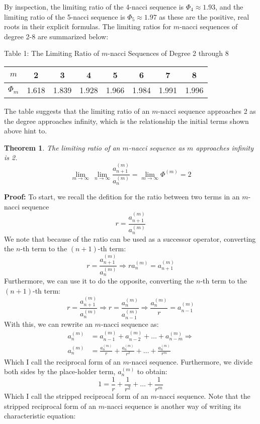 \documentclass[11pt]{article}
\newtheorem{theorem}{Theorem}[section]
\begin{document}
By inspection, the limiting ratio of the 4-nacci sequence is \(\Phi_{4}\approx1.93\), and the limiting ratio of the 5-nacci sequence is \(\Phi_{5}\approx1.97\) as these are the positive, real roots in their explicit formulas. The limiting ratios for \(m\)-nacci sequences of degree 2-8 are summarized below:
\begin{center}
    Table 1: The Limiting Ratio of \(m\)-nacci Sequences of Degree 2 through 8
    \begin{tabular}{|c|c|c|c|c|c|c|c|} 
     \hline
     \(m\) & 2 & 3 & 4 & 5 & 6 & 7 & 8 \\ 
     \hline
     \(\Phi_m\) & 1.618 & 1.839 & 1.928 & 1.966 & 1.984 & 1.991 & 1.996 \\
     \hline
    \end{tabular}
    \end{center}
The table suggests that the limiting ratio of an \(m\)-nacci sequence approaches 2 as the degree approaches infinity, which is the relationship the initial terms shown above hint to. 
\begin{theorem}
    The limiting ratio of an \(m\)-nacci sequence as \(m\) approaches infinity is 2. 
    \[{\lim_{m\to\infty}}\ {\lim_{n\to\infty}} \frac{a^{(m)}_{n+1}}{a^{(m)}_{n}}=\lim_{m\to\infty}\Phi^{(m)}=2\]
\end{theorem}
\textbf{Proof:} To start, we recall the defition for the ratio between two terms in an \(m\)-nacci sequence 
\[r=\frac{a^{(m)}_{n+1}}{a^{(m)}_n}\]
We note that because of the ratio can be used as a successor operator, converting the \(n\)-th term to the \((n+1)\)-th term:
\[r=\frac{a^{(m)}_{n+1}}{a^{(m)}_n}\Rightarrow r a^{(m)}_n = a^{(m)}_{n+1}\]
Furthermore, we can use it to do the opposite, converting the \(n\)-th term to the \((n+1)\)-th term:
\[r=\frac{a^{(m)}_{n+1}}{a^{(m)}_n}\Rightarrow r=\frac{a^{(m)}_{n}}{a^{(m)}_{n-1}}\Rightarrow \frac{a^{(m)}_{n}}{r}=a^{(m)}_{n-1}\]
With this, we can rewrite an \(m\)-nacci sequence as:
\begin{align*}
    a_n^{(m)}&=a_{n-1}^{(m)}+a_{n-2}^{(m)}+\dots +a_{n-m}^{(m)} \Rightarrow\\
    a_n^{(m)}&=\frac{a_n^{(m)}}{r}+\frac{a_n^{(m)}}{r^2}+\dots+\frac{a_n^{(m)}}{r^m}
\end{align*}
Which I call the reciprocal form of an \(m\)-nacci sequence. Furthermore, we divide both sides by the place-holder term, \(a_n^{(m)}\) to obtain:
\[1=\frac{1}{r}+\frac{1}{r^2}+\dots+\frac{1}{r^m}\]
Which I call the stripped reciprocal form of an \(m\)-nacci sequence. Note that the stripped reciprocal form of an \(m\)-nacci sequence is another way of writing its characteristic equation:
\end{document}
